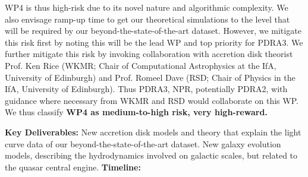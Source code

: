 \smallskip
\smallskip
\noindent
WP4 is thus high-risk
due to its novel nature and algorithmic complexity.  We also envisage
ramp-up time to get our theoretical simulations to the level that will
be required by our beyond-the-state-of-the-art dataset.  However, we
mitigate this risk first by noting this will be the lead WP and top
priority for PDRA3.  We further mitigate this risk by invoking
collaboration with accretion disk theorist Prof. Ken Rice (WKMR; Chair
of Computational Astrophysics at the IfA, University of Edinburgh) and
Prof. Romeel Dave (RSD; Chair of Physics in the IfA, University of
Edinburgh).
Thus PDRA3, NPR, potentially PDRA2, with guidance where necessary from
WKMR and RSD would collaborate on this WP.  We thus classify {\bf WP4
as medium-to-high risk, very high-reward.}  

\smallskip
\smallskip
\noindent
{\bf Key Deliverables:}
New accretion disk models and theory that explain the light curve data
of our beyond-the-state-of-the-art dataset.  New galaxy evolution
models, describing the hydrodynamics involved on galactic scales, but
related to the quasar central engine. {\bf Timeline:} 



